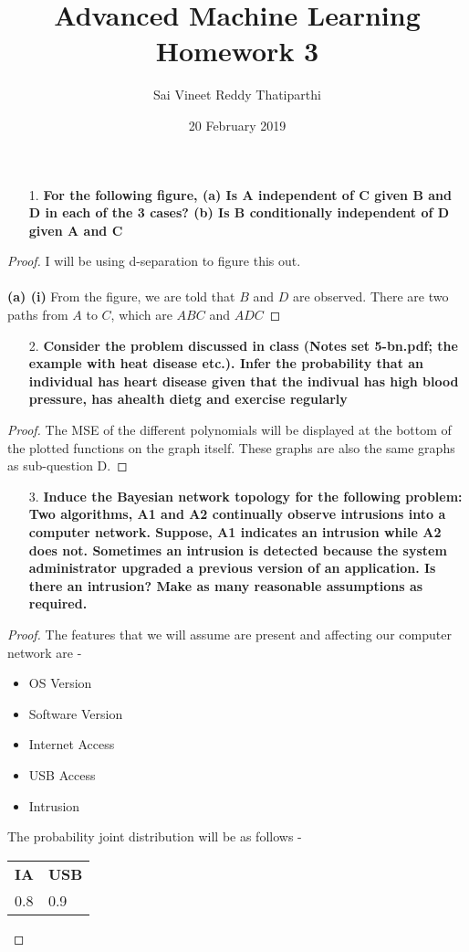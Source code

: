 \documentclass{article}
\date{20 February 2019}
\theoremstyle{case}
\begin{document}
\author{Sai Vineet Reddy Thatiparthi}

 \title{%
  Advanced Machine Learning \\
  \large Homework 3}
\maketitle
\begin{enumerate}
    \item [1.] \textbf{For the following figure, (a) Is A independent of C given B and D in each
of the 3 cases? (b) Is B conditionally independent of D given A and C}
\end{enumerate} 
\begin{proof} 
I will be using d-separation to figure this out.\\ \\
\textbf{(a) (i)} From the figure, we are told that $B$ and $D$ are observed. There are two paths from $A$ to $C$, which are $ABC$ and $ADC$
\end{proof}

\begin{enumerate}
    \item [2.] \textbf{Consider the problem discussed in class (Notes set 5-bn.pdf; the example
with heat disease etc.). Infer the probability that an individual has heart
disease given that the indivual has high blood pressure, has ahealth dietg
and exercise regularly}
\end{enumerate}
\begin{proof}
The MSE of the different polynomials will be displayed at the bottom of the plotted functions on the graph itself. These graphs are also the same graphs as sub-question D.

\end{proof}
\begin{enumerate}
    \item [3.] \textbf{Induce the Bayesian network topology for the following problem: Two
algorithms, A1 and A2 continually observe intrusions into a computer
network. Suppose, A1 indicates an intrusion while A2 does not. Sometimes
an intrusion is detected because the system administrator upgraded a
previous version of an application. Is there an intrusion? Make as many
reasonable assumptions as required.}
\end{enumerate} 
\begin{proof} 
The features that we will assume are present and affecting our computer network are - 
\begin{itemize}
  \item OS Version
  \item Software Version
  \item Internet Access
  \item USB Access
  \item Intrusion
\end{itemize}
The probability joint distribution will be as follows -
\begin{table}[]
\begin{tabular}{ll}
\textbf{IA} & \textbf{USB} \\
0.8 & 0.9
\end{tabular}
\end{table}
\end{proof}
\end{document}
